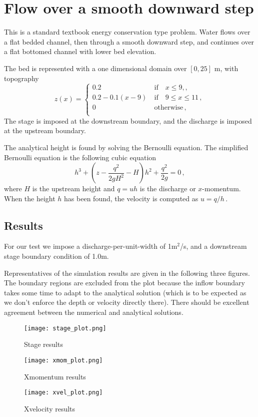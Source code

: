 
\section{Flow over a smooth downward step}

This is a standard textbook energy conservation type problem. Water flows over a flat bedded channel, then through a smooth downward step, and continues over a flat bottomed channel with lower bed elevation.

The bed is represented with a one dimensional domain over $[0,25]$ m, with topography
\begin{equation}
z(x)= \left\{ \begin{array}{ll}
 0.2 & ~\textrm{if}\quad x \leq 9 ,,\\
 0.2-0.1(x-9) & ~\textrm{if}\quad 9 \leq x \leq 11\,,\\
 0 & ~\textrm{otherwise}\,,\\
\end{array} \right.
\end{equation}
The stage is imposed at the downstream boundary, and the discharge is imposed at the upstream boundary.

The analytical height is found by solving the Bernoulli equation. The simplified Bernoulli equation is the following cubic equation
\begin{equation}
h^3 + \left(z - \frac{q^2}{2 g H^2} - H \right) h^2 + \frac{q^2}{2 g} = 0\,,
\end{equation}
where $H$ is the upstream height and $q=uh$ is the discharge or $x$-momentum. When the height $h$ has been found, the velocity is computed as $u=q/h$\,.

\subsection{Results}
For our test we impose a discharge-per-unit-width of 1m$^2$/s, and a downstream stage boundary condition of 1.0m. 

Representatives of the simulation results are given in the following three figures. The boundary regions are excluded from the plot because the inflow boundary takes some time to adapt to the analytical solution (which is to be expected as we don't enforce the depth or velocity directly there). There should be excellent agreement between the numerical and analytical solutions. 

\begin{figure}
\begin{center}
\texttt{[image: stage\_plot.png]}
\end{center}
\caption{Stage results}
\end{figure}


\begin{figure}
\begin{center}
\texttt{[image: xmom\_plot.png]}
\end{center}
\caption{Xmomentum results}
\end{figure}


\begin{figure}
\begin{center}
\texttt{[image: xvel\_plot.png]}
\end{center}
\caption{Xvelocity results}
\end{figure}


\endinput
